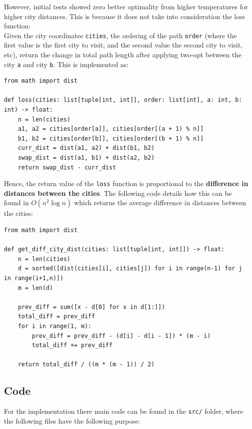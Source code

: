 \documentclass{article}
\begin{document}
However, initial tests showed zero better optimality from higher temperatures for higher city distances.
This is because it does not take into consideration the loss function: 
\\
Given the city coordinates \texttt{cities}, the ordering of the path \texttt{order} (where the first value is the first city to visit, and the second value the second city to visit, etc), return the change in total path length after applying two-opt between the city \texttt{a} and city \texttt{b}.
This is implemented as:

\begin{verbatim}
from math import dist

def loss(cities: list[tuple[int, int]], order: list[int], a: int, b: int) -> float:
    n = len(cities)
    a1, a2 = cities[order[a]], cities[order[(a + 1) % n]]
    b1, b2 = cities[order[b]], cities[order[(b + 1) % n]]
    curr_dist = dist(a1, a2) + dist(b1, b2)
    swap_dist = dist(a1, b1) + dist(a2, b2)
    return swap_dist - curr_dist
\end{verbatim}

Hence, the return value of the \texttt{loss} function is proportional to the \textbf{difference in distances between the cities}.
The following code details how this can be found in $O(n^2 \log n)$ which returns the average difference in distances between the cities:

\begin{verbatim}
from math import dist

def get_diff_city_dist(cities: list[tuple[int, int]]) -> float:
    n = len(cities)
    d = sorted([dist(cities[i], cities[j]) for i in range(n-1) for j in range(i+1,n)])
    m = len(d)
    
    prev_diff = sum([x - d[0] for x in d[1:]])
    total_diff = prev_diff
    for i in range(1, m):
        prev_diff = prev_diff - (d[i] - d[i - 1]) * (m - i)
        total_diff += prev_diff
    
    return total_diff / ((m * (m - 1)) / 2)
\end{verbatim}

\newpage
\subsection{Code}

For the implementation there main code can be found in the \texttt{src/} folder, where the following files have the following purpose:
\end{document}
